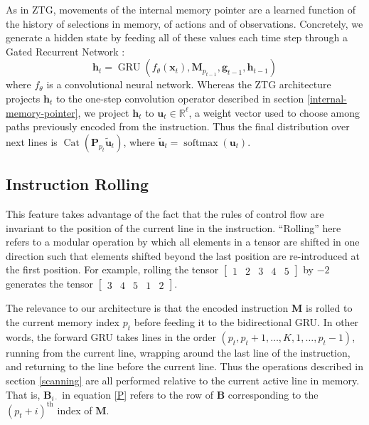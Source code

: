 \documentclass{article}
\DeclareMathOperator{\GRU}{GRU}
\DeclareMathOperator{\Cat}{Cat}
\DeclareMathOperator{\softmax}{softmax}
\begin{document}
As in ZTG, movements of the internal memory pointer are a learned
function of the history of selections in memory, of actions and of observations.
Concretely, we generate a hidden state by feeding all of these values each time
step through a Gated Recurrent Network \cite{ChoMGBSB14}:
\begin{equation}
  \mathbf{h}_t = \GRU\left(f_\theta\left(\mathbf{x}_t\right),
    \mathbf{M}_{p_{t-1}}, \mathbf{g}_{t-1},
  \mathbf{h}_{t-1}\right)
\end{equation}
where $f_\theta$ is a convolutional neural network. Whereas the
ZTG architecture
projects $\mathbf{h}_{t}$ to the one-step convolution operator described in
section \ref{internal-memory-pointer}, we project $\mathbf{h}_t$ to $\mathbf{u}_t\in \mathbb{R}^\ell$, a weight vector
used to choose among paths previously encoded from the instruction. Thus the final
distribution over next lines is
$\Cat(\mathbf{P}_{p_t}\tilde{\mathbf{u}}_t)$, where $\tilde{\mathbf{u}}_t =
\softmax\left(\mathbf{u}_t\right)$.


\subsection{Instruction Rolling}
\label{rolling}
This feature takes advantage of the fact that the rules of control flow are
invariant to the position of the current line in the instruction. ``Rolling'' here
refers to a modular operation by which all elements in a tensor are shifted in
one direction such that elements shifted beyond the last position are
re-introduced at the first position. For example, rolling the tensor 
$\begin{bmatrix} 1 & 2 & 3 & 4 & 5 \end{bmatrix}$ by $-2$ generates the tensor
$\begin{bmatrix} 3 & 4 & 5 & 1 & 2 \end{bmatrix}$. 

The relevance to our architecture is that the encoded instruction $\mathbf{M}$ is rolled to the current memory index
$p_t$ before feeding it to the bidirectional GRU. In other words, the forward GRU takes lines in the
order $(p_t, p_t + 1, \dots, K, 1, \dots, p_t - 1)$, running from the current
line, wrapping around the last line of the instruction, and returning to the line
before the current line. Thus the operations described in section \ref{scanning} are all performed
relative to the current active line in memory. That is, $\mathbf{B}_{i\cdot}$ in
equation \ref{P} refers to the row of $\mathbf{B}$ corresponding to the $(p_t +
i)^{\text{th}}$ index of $\mathbf{M}$.
\end{document}
